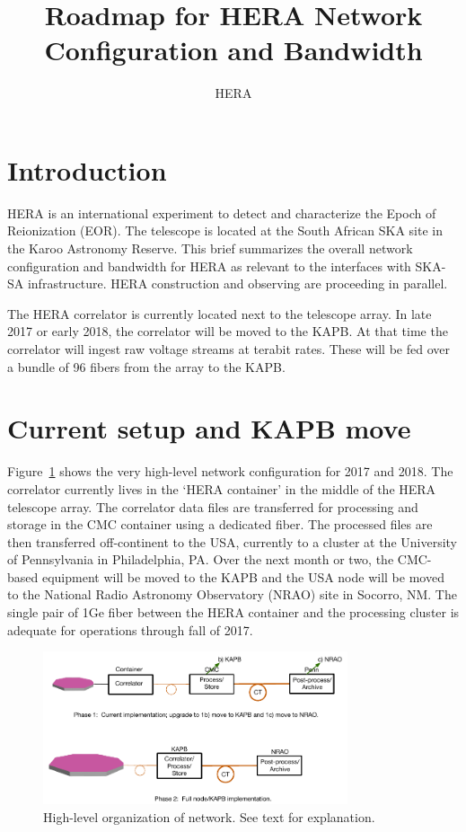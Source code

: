 \documentclass{article}
\begin{document}
\author{HERA}
\title{Roadmap for HERA Network Configuration and Bandwidth}
\maketitle

\section{Introduction}
HERA is an international experiment to detect and characterize the Epoch of
Reionization (EOR).  The telescope is located at the South African SKA site in
the Karoo Astronomy Reserve.  This brief summarizes the overall network
configuration and bandwidth for HERA as relevant to the interfaces with SKA-SA
infrastructure.  HERA construction and observing are proceeding in parallel.

The HERA correlator is currently located next to the telescope array. In late 2017 or early 2018, the correlator will be moved to the KAPB. At that time the correlator will ingest raw voltage streams at terabit rates. These will be fed over a bundle of 96 fibers from the array to the KAPB.

\section{Current setup and KAPB move}
Figure~\ref{fig:hi_level} shows the very high-level network configuration for
2017 and 2018.  The correlator currently lives in the `HERA container' in the
middle of the HERA telescope array.  The correlator data files are transferred for processing and storage in the CMC container using a dedicated fiber.  The processed files are then transferred off-continent to the USA, currently to a cluster at the University of Pennsylvania in Philadelphia, PA.  Over the next month or two, the CMC-based equipment will be moved to the KAPB and the USA node will be moved to the National Radio Astronomy Observatory (NRAO) site in Socorro, NM.  The single pair of 1Ge fiber between the HERA container and the processing cluster is adequate for operations through fall of 2017.

\begin{figure}[H]
\includegraphics[width=0.8\textwidth]{network.pdf}
\centering
\caption{High-level organization of network.  See text for explanation.}
\label{fig:hi_level}
\end{figure}
\end{document}
